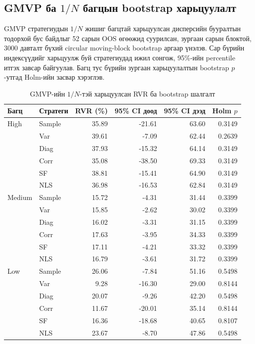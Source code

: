 \subsection{GMVP ба $1/N$ багцын bootstrap харьцуулалт}
\label{subsec:bootstrap_equal_weight_results}

GMVP стратегиудын $1/N$ жишиг багцтай
харьцуулсан дисперсийн бууралтын
тодорхой бус байдлыг 52 сарын OOS
өгөөжид суурилсан, зургаан сарын
блоктой, 3000 давталт бүхий circular
moving-block bootstrap аргаар үнэлэв.
Сар бүрийн индексүүдийг харьцуулж буй
стратегиудад ижил сонгож,
95\%-ийн percentile итгэх завсар
байгуулав. Багц тус бүрийн зургаан
харьцуулалтын bootstrap $p$-утгад
Holm-ийн засвар хэрэглэв.

\begin{table}[htbp]
	\centering
	\caption{GMVP-ийн $1/N$-тэй харьцуулсан RVR ба bootstrap шалгалт}
	\label{tab:bootstrap_equal_weight}
	\small
	\begin{tabular}{llrrrr}
		\hline
		Багц & Стратеги & RVR (\%) &
		95\% CI доод & 95\% CI дээд & Holm $p$ \\
		\hline
		High & Sample & 35.89 & -21.61 & 63.60 & 0.3149 \\
		& Var & 39.61 & -7.09 & 62.44 & 0.2639 \\
		& Diag & 37.93 & -15.32 & 64.14 & 0.3149 \\
		& Corr & 35.08 & -38.50 & 69.33 & 0.3149 \\
		& SF & 38.81 & -15.41 & 64.90 & 0.3149 \\
		& NLS & 36.98 & -16.53 & 62.84 & 0.3149 \\
		\hline
		Medium & Sample & 15.72 & -4.31 & 31.44 & 0.3399 \\
		& Var & 15.85 & -2.62 & 30.02 & 0.3399 \\
		& Diag & 16.02 & -3.31 & 31.15 & 0.3399 \\
		& Corr & 17.63 & -3.95 & 34.33 & 0.3399 \\
		& SF & 17.11 & -4.21 & 33.32 & 0.3399 \\
		& NLS & 16.79 & -3.61 & 31.72 & 0.3399 \\
		\hline
		Low & Sample & 26.06 & -7.84 & 51.16 & 0.5498 \\
		& Var & 9.28 & -16.30 & 29.00 & 0.8144 \\
		& Diag & 20.07 & -9.26 & 42.20 & 0.5498 \\
		& Corr & 11.67 & -20.01 & 35.14 & 0.8144 \\
		& SF & 16.36 & -18.68 & 40.65 & 0.8107 \\
		& NLS & 23.67 & -8.70 & 47.86 & 0.5498 \\
		\hline
	\end{tabular}
\end{table}

